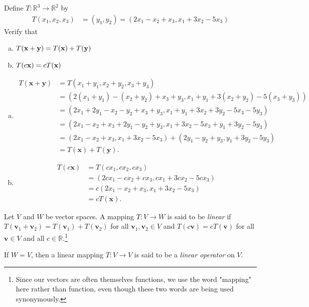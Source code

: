 \documentclass[12pt,letterpaper,reqno]{article}
\numberwithin{equation}{section}
\begin{document}
\begin{exercise}\label{ex:r_3_to_r_2}
Define $T:\mathbb{R}^3 \to \mathbb{R}^2$ by
\begin{align*}
T(x_1,x_2,x_3)&=(y_1,y_2)=(2x_1-x_2+x_3, x_1+3x_2-5x_3)
\end{align*}
Verify that
\begin{enumerate}[(a)]
	\item $T({\bf x}+{\bf y})=T({\bf x})+T({\bf y})$
	\item $T(c{\bf x})=cT({\bf x})$
\end{enumerate}	
\end{exercise}
\newpage 
{\color{red}
\begin{solution}
	\begin{enumerate}[(a)] Let $\mathbf{x}=(x_1,x_2,x_3)$ and $\mathbf{y}=(y_1,y_2,y_3)$. Then
		\item 
		\begin{align*}
			T(\mathbf{x}+\mathbf{y})&=T(x_1+y_1,x_2+y_2,x_3+y_3) \\
			&=(2(x_1+y_1)-(x_2+y_2)+x_3+y_3,x_1+y_1+3(x_2+y_2)-5(x_3+y_3)) \\
			&=(2x_1+2y_1-x_2-y_2+x_3+y_3,x_1+y_1+3x_2+3y_2-5x_3-5y_3) \\
			&=(2x_1-x_2+x_3+2y_1-y_2+y_3,x_1+3x_2-5x_3+y_1+3y_2-5y_3) \\
			&=(2x_1-x_2+x_3,x_1+3x_2-5x_3)+(2y_1-y_2+y_3,y_1+3y_2-5y_3) \\
			&=T(\mathbf{x})+T(\mathbf{y}).
		\end{align*}
		\item 
		\begin{align*}
			T(c\mathbf{x})&=T(cx_1,cx_2,cx_3) \\
			&=(2cx_1-cx_2+cx_3,cx_1+3cx_2-5cx_3) \\
			&=c(2x_1-x_2+x_3,x_1+3x_2-5x_3) \\
			&=cT(\mathbf{x}).
		\end{align*}
	\end{enumerate}
\end{solution}}

\begin{defn}\label{def:linear_mapping}
	Let $V$ and $W$ be vector spaces. A mapping $T:V \to W$ is said to be \emph{linear} if $T(\mathbf{v}_1+\mathbf{v}_2)=T(\mathbf{v}_1)+T(\mathbf{v}_2)$ for all $\mathbf{v}_1, \mathbf{v}_2 \in V$ and $T(c\mathbf{v})=cT(\mathbf{v})$ for all $\mathbf{v} \in V$ and all $c \in \mathbb{R}$.\footnote{Since our vectors are often themselves functions, we use the word "mapping" here rather than function, even though these two words are being used synonymously.} 
	
	If $W=V$, then a linear mapping $T:V \to V$ is said to be a \emph{linear operator} on $V$.	
\end{defn}
\end{document}
